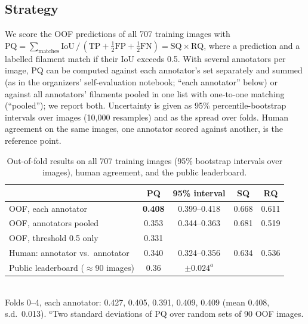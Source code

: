 \documentclass[sigconf]{acmart}
\begin{document}
\subsection{Strategy}
We score the OOF predictions of all 707 training images with $\mathrm{PQ}=\sum_{\text{matches}}\mathrm{IoU}\,/\,(\mathrm{TP}+\frac12\mathrm{FP}+\frac12\mathrm{FN})=\mathrm{SQ}\times\mathrm{RQ}$, where a prediction and a labelled filament match if their IoU exceeds 0.5. With several annotators per image, PQ can be computed against each annotator's set separately and summed (as in the organizers' self-evaluation notebook; ``each annotator'' below) or against all annotators' filaments pooled in one list with one-to-one matching (``pooled''); we report both. Uncertainty is given as 95\% percentile-bootstrap intervals over images (10{,}000 resamples) and as the spread over folds. Human agreement on the same images, one annotator scored against another, is the reference point.

\begin{table}[t]
  \caption{Out-of-fold results on all 707 training images (95\% bootstrap intervals over images), human agreement, and the public leaderboard.}
  \label{tab:main}
  \small
  \begin{tabular}{@{}lcccc@{}}
    \toprule
    & PQ & 95\% interval & SQ & RQ \\
    \midrule
    OOF, each annotator & \textbf{0.408} & 0.399--0.418 & 0.668 & 0.611 \\
    OOF, annotators pooled & 0.353 & 0.344--0.363 & 0.681 & 0.519 \\
    OOF, threshold 0.5 only & 0.331 & & & \\
    Human: annotator vs.\ annotator & 0.340 & 0.324--0.356 & 0.634 & 0.536 \\
    Public leaderboard ($\approx$90 images) & 0.36 & $\pm0.024^a$ & & \\
    \bottomrule
  \end{tabular}\\[2pt]
  {\footnotesize Folds 0--4, each annotator: 0.427, 0.405, 0.391, 0.409, 0.409 (mean 0.408, s.d.\ 0.013). $^a$Two standard deviations of PQ over random sets of 90 OOF images.}
\end{table}
\end{document}
